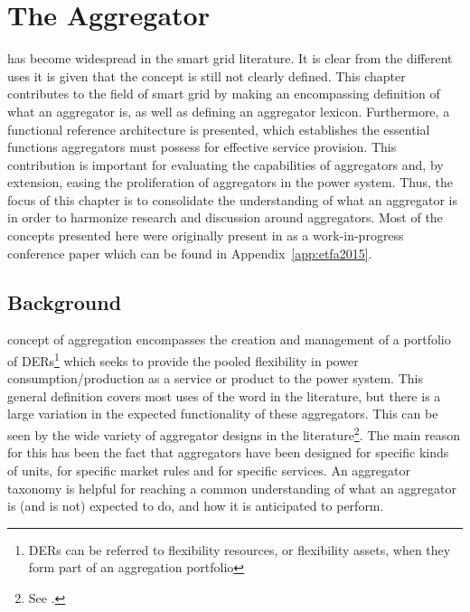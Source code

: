 \chapter{The Aggregator} %
\label{cha:aggregator}%
 has become widespread in the smart grid literature. It is clear from the different uses it is given that the concept is still not clearly defined. This chapter contributes to the field of smart grid by making an encompassing definition of what an aggregator is, as well as defining an aggregator lexicon. Furthermore, a functional reference architecture is presented, which establishes the essential functions aggregators must possess for effective service provision. This contribution is important for evaluating the capabilities of aggregators and, by extension, easing the proliferation of aggregators in the power system. Thus, the focus of this chapter is to consolidate the understanding of what an aggregator is in order to harmonize research and discussion around aggregators. Most of the concepts presented here were originally present in as a work-in-progress conference paper which can be found in Appendix~\ref{app:etfa2015}. 

\section{Background}
 concept of aggregation encompasses the creation and management of a portfolio of DERs\footnote{DERs can be referred to flexibility resources, or flexibility assets, when they form part of an aggregation portfolio} which seeks to provide the pooled flexibility in power consumption/production as a service or product to the power system. This general definition covers most uses of the word in the literature, but there is a large variation in the expected functionality of these aggregators. This can be seen by the wide variety of aggregator designs in the literature\footnote{See \eg\cite{kok2005powermatcher,han2010development,sortomme2011optimal,costanzo2013coordination}.}. The main reason for this has been the fact that aggregators have been designed for specific kinds of units, for specific market rules and for specific services. An aggregator taxonomy is helpful for reaching a common understanding of what an aggregator is (and is not) expected to do, and how it is anticipated to perform.

